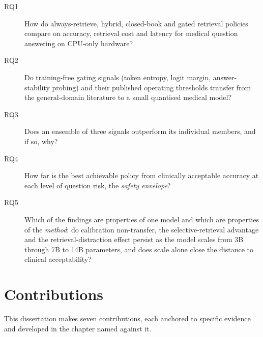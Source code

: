 \begin{description}
  \item[RQ1] How do always-retrieve, hybrid, closed-book and gated retrieval
    policies compare on accuracy, retrieval cost and latency for medical
    question answering on CPU-only hardware?
  \item[RQ2] Do training-free gating signals (token entropy, logit margin,
    answer-stability probing) and their published operating thresholds
    transfer from the general-domain literature to a small quantised medical
    model?
  \item[RQ3] Does an ensemble of three signals outperform its individual
    members, and if so, why?
  \item[RQ4] How far is the best achievable policy from clinically acceptable
    accuracy at each level of question risk, the \emph{safety envelope}?
  \item[RQ5] Which of the findings are properties of one model and which are
    properties of the \emph{method}: do calibration non-transfer, the
    selective-retrieval advantage and the retrieval-distraction effect
    persist as the model scales from 3B through 7B to 14B parameters, and
    does scale alone close the distance to clinical acceptability?
\end{description}


\section{Contributions}
\label{sec:intro-contributions}

This dissertation makes seven contributions, each anchored to specific
evidence and developed in the chapter named against it.

